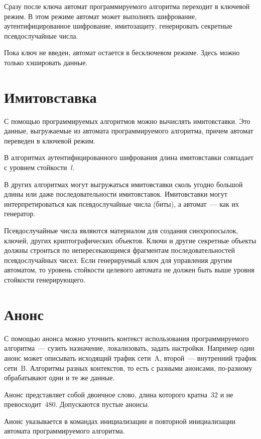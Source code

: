 Сразу после  ключа автомат программируемого алгоритма 
переходит в ключевой режим. В этом режиме автомат может выполнять шифрование, 
аутентифицированное шифрование, имитозащиту, генерировать секретные 
псевдослучайные числа.

Пока ключ не введен, автомат остается в бесключевом режиме. Здесь можно только 
хэшировать данные. 

\section{Имитовставка}\label{COMMON.MAC}

С помощью программируемых алгоритмов можно вычислять имитовставки.
Это данные, выгружаемые из автомата программируемого алгоритма,
причем автомат переведен в ключевой режим.

В алгоритмах аутентифицированного шифрования длина имитовставки 
совпадает с уровнем стойкости~$l$. 

В других алгоритмах могут выгружаться имитовставки сколь угодно большой длины
или даже последовательности имитовставок. Имитовставки могут интерпретироваться 
как псевдослучайные числа (биты), а автомат~--- как их генератор.

Псевдослучайные числа являются материалом для создания синхропосылок,
ключей, других криптографических объектов. 
%
Ключи и другие секретные объекты должны строиться по непересекающимся 
фрагментам последовательностей псевдослучайных чисел.
%
Если генерируемый ключ  для управления другим автоматом, 
то уровень стойкости целевого автомата не должен быть выше уровня стойкости
генерирующего.

\section{Анонс}\label{COMMON.Anounce}

С помощью анонса можно уточнить контекст использования программируемого 
алгоритма~--- сузить назначение, локализовать, задать настройки.
%
Например один анонс может описывать исходящий трафик сети~A, 
второй~--- внутренний трафик сети~B.
%
Алгоритмы разных контекстов, то есть с разными анонсами, 
по-разному обрабатывают одни и те же данные. 

Анонс представляет собой двоичное слово, длина которого кратна~$32$ и не 
превосходит~$480$. Допускаются пустые анонсы.

Анонс указывается в командах инициализации и повторной инициализации
автомата программируемого алгоритма. 

